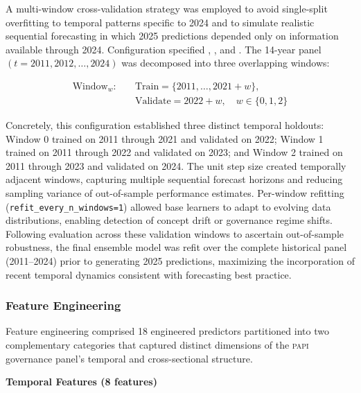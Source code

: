 \documentclass[12pt,a4paper]{article}
\newcommand{\PAPI}{\textsc{papi}\xspace}
\begin{document}
A multi-window cross-validation strategy was employed to avoid single-split overfitting to temporal patterns specific to 2024 and to simulate realistic sequential forecasting in which 2025 predictions depended only on information available through 2024. Configuration specified , , and . The 14-year panel $(t = 2011, 2012, \ldots, 2024)$ was decomposed into three overlapping windows:

\begin{equation}
\label{eq:validation_windows}
\begin{aligned}
\text{Window}_w:\quad
  &\text{Train}    = \{2011, \ldots, 2021 + w\}, \\
  &\text{Validate} = 2022 + w,
  \quad w \in \{0, 1, 2\}
\end{aligned}
\end{equation}

Concretely, this configuration established three distinct temporal holdouts: Window 0 trained on 2011 through 2021 and validated on 2022; Window 1 trained on 2011 through 2022 and validated on 2023; and Window 2 trained on 2011 through 2023 and validated on 2024. The unit step size created temporally adjacent windows, capturing multiple sequential forecast horizons and reducing sampling variance of out-of-sample performance estimates. Per-window refitting (\texttt{refit\_every\_n\_windows=1}) allowed base learners to adapt to evolving data distributions, enabling detection of concept drift or governance regime shifts. Following evaluation across these validation windows to ascertain out-of-sample robustness, the final ensemble model was refit over the complete historical panel (2011--2024) prior to generating 2025 predictions, maximizing the incorporation of recent temporal dynamics consistent with forecasting best practice.

\subsubsection{Feature Engineering}
\label{subsubsec:feature_engineering}

Feature engineering comprised 18 engineered predictors partitioned into two complementary categories that captured distinct dimensions of the \PAPI governance panel's temporal and cross-sectional structure.

\textbf{Temporal Features (8 features)}
\end{document}
